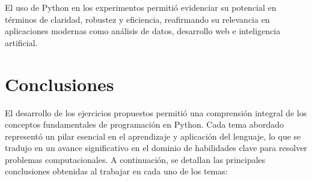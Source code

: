 \documentclass[conference]{IEEEtran}
\begin{document}
El uso de Python en los experimentos permitió evidenciar su potencial en términos de claridad, robustez y eficiencia, reafirmando su relevancia en aplicaciones modernas como análisis de datos, desarrollo web e inteligencia artificial.

        
\section{Conclusiones}

El desarrollo de los ejercicios propuestos permitió una comprensión integral de los conceptos fundamentales de programación en Python. Cada tema abordado representó un pilar esencial en el aprendizaje y aplicación del lenguaje, lo que se tradujo en un avance significativo en el dominio de habilidades clave para resolver problemas computacionales. A continuación, se detallan las principales conclusiones obtenidas al trabajar en cada uno de los temas:
\end{document}
